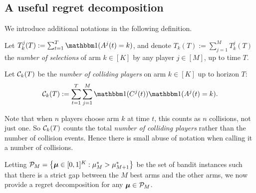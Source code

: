 \subsection{A useful regret decomposition}
\label{sub:5:defregret}

We introduce additional notations in the following definition.

\begin{definition}
\begin{leftbar}[defnbar]  %
  \label{def:5:nbSelections_nbCollisions}
  Let $T^j_k(T) := \sum_{t=1}^T \indic(A^j(t) = k)$,
  and denote $T_k(T) := \sum_{j=1}^M T^j_k(T)$ the \emph{number of selections} of arm $k\in[K]$ by any player $j\in[M]$, up to time $T$.

  Let $\mathcal{C}_k(T)$ be the \emph{number of colliding players} on arm $k\in[K]$ up to horizon $T$:
  \begin{equation}
    \cC_k(T) :=
    \sum_{t=1}^{T} \sum_{j=1}^{M} \indic(C^j(t)) \indic(A^j(t) = k).
  \end{equation}
\end{leftbar}  %
\end{definition}

Note that when $n$ players choose arm $k$ at time $t$, this counts as $n$ collisions, not just one. So $\mathcal{C}_k(T)$ counts the total \emph{number of colliding players} rather than the number of collision events. Hence there is small abuse of notation when calling it a number of collisions.

Letting $\mathcal{P}_M = \left\{ \boldsymbol{\mu} \in [0,1]^K : \mu_M^* > \mu_{M+1}^*\right\}$
be the set of bandit instances such that there is a strict gap between the $M$ best arms and the other arms, we now provide a regret decomposition for any $\boldsymbol{\mu} \in \mathcal{P}_M$.

